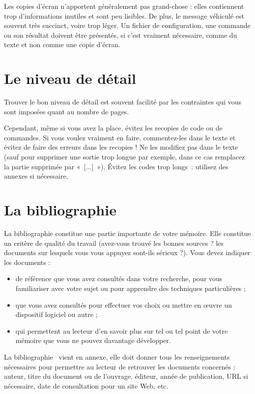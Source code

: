 \documentclass [twoside,openright,a4paper,11pt,french] {report}
\begin{document}
Les copies d'écran n'apportent généralement pas grand-chose : elles
contiennent trop d'informations inutiles et sont peu lisibles. De plus,
le message véhiculé est souvent très succinct, voire trop léger. Un
fichier de configuration, une commande ou son résultat doivent être
présentés, si c'est vraiment nécessaire, comme du texte et non comme
une copie d'écran.

\section {Le niveau de détail}

Trouver le bon niveau de détail est souvent facilité par les contraintes
qui vous sont imposées quant au nombre de pages.

Cependant, même si vous avez la place, évitez les recopies de code ou de
commandes. Si vous voulez vraiment en faire, commentez-les dans le texte
et évitez de faire des erreurs dans les recopies ! Ne les modifiez pas
dans le texte (sauf pour supprimer une sortie trop longue par exemple,
dans ce cas remplacez la partie supprimée par «~[...]~»). Évitez
les codes trop longs~: utilisez des annexes si nécessaire.


\section {La bibliographie}

La bibliographie constitue une partie importante de votre mémoire.
Elle constitue un critère de qualité du travail (avez-vous trouvé les
bonnes sources ? les documents sur lesquels vous vous appuyez sont-ils
sérieux ?). Vous devez indiquer les documents :

\begin {itemize}
    \item de référence que vous avez consultés dans votre recherche,
	pour vous familiariser avec votre sujet ou pour apprendre
	des techniques particulières ;
    \item que vous avez consultés pour effectuer vos choix ou mettre
	en œuvre un dispositif logiciel ou autre ;
    \item qui permettent au lecteur d'en savoir plus sur tel ou tel
	point de votre mémoire que vous ne pouvez davantage développer.
\end {itemize}

La bibliographie~\cite {savoirs2010} vient en annexe, elle doit donner
tous les renseignements nécessaires pour permettre au lecteur de
retrouver les documents concernés : auteur, titre du document ou de
l'ouvrage, éditeur, année de publication, URL si nécessaire, date de
consultation pour un site Web, etc.
\end{document}
